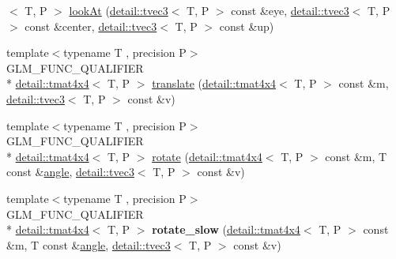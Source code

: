 \begin{DoxyCompactItemize}
$<$ T, P $>$ \hyperlink{group__gtc__matrix__transform_ga454fdf3163c2779eeeeeb9d75907ce97}{look\-At} (\hyperlink{structglm_1_1detail_1_1tvec3}{detail\-::tvec3}$<$ T, P $>$ const \&eye, \hyperlink{structglm_1_1detail_1_1tvec3}{detail\-::tvec3}$<$ T, P $>$ const \&center, \hyperlink{structglm_1_1detail_1_1tvec3}{detail\-::tvec3}$<$ T, P $>$ const \&up)
\item 
{\footnotesize template$<$typename T , precision P$>$ }\\G\-L\-M\-\_\-\-F\-U\-N\-C\-\_\-\-Q\-U\-A\-L\-I\-F\-I\-E\-R \\*
\hyperlink{structglm_1_1detail_1_1tmat4x4}{detail\-::tmat4x4}$<$ T, P $>$ \hyperlink{group__gtc__matrix__transform_ga1501de0fa580dcc491b67e0685bbc7c2}{translate} (\hyperlink{structglm_1_1detail_1_1tmat4x4}{detail\-::tmat4x4}$<$ T, P $>$ const \&m, \hyperlink{structglm_1_1detail_1_1tvec3}{detail\-::tvec3}$<$ T, P $>$ const \&v)
\item 
{\footnotesize template$<$typename T , precision P$>$ }\\G\-L\-M\-\_\-\-F\-U\-N\-C\-\_\-\-Q\-U\-A\-L\-I\-F\-I\-E\-R \\*
\hyperlink{structglm_1_1detail_1_1tmat4x4}{detail\-::tmat4x4}$<$ T, P $>$ \hyperlink{group__gtc__matrix__transform_ga61e65a3bb227c267d1a15113d1056fb1}{rotate} (\hyperlink{structglm_1_1detail_1_1tmat4x4}{detail\-::tmat4x4}$<$ T, P $>$ const \&m, T const \&\hyperlink{group__gtc__quaternion_ga23a3fc7ada5bbb665ff84c92c6e0542c}{angle}, \hyperlink{structglm_1_1detail_1_1tvec3}{detail\-::tvec3}$<$ T, P $>$ const \&v)
\item 
\hypertarget{namespaceglm_a03bd2c89f62ae44ad3a5e5dc21effd06}{{\footnotesize template$<$typename T , precision P$>$ }\\G\-L\-M\-\_\-\-F\-U\-N\-C\-\_\-\-Q\-U\-A\-L\-I\-F\-I\-E\-R \\*
\hyperlink{structglm_1_1detail_1_1tmat4x4}{detail\-::tmat4x4}$<$ T, P $>$ {\bfseries rotate\-\_\-slow} (\hyperlink{structglm_1_1detail_1_1tmat4x4}{detail\-::tmat4x4}$<$ T, P $>$ const \&m, T const \&\hyperlink{group__gtc__quaternion_ga23a3fc7ada5bbb665ff84c92c6e0542c}{angle}, \hyperlink{structglm_1_1detail_1_1tvec3}{detail\-::tvec3}$<$ T, P $>$ const \&v)}\label{namespaceglm_a03bd2c89f62ae44ad3a5e5dc21effd06}


\end{DoxyCompactItemize}
